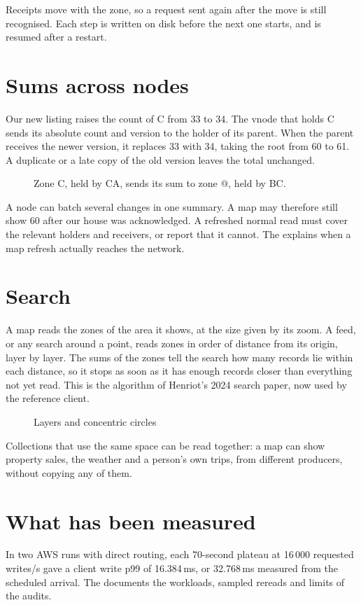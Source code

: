 \documentclass[11pt]{article}
\begin{document}
Receipts move with the zone, so a request sent again after the move is still recognised. Each step is written on disk before the next one starts, and is resumed after a restart.

\section{Sums across nodes}\hypertarget{ix:summaries}{}
Our new listing raises the count of C from 33 to 34. The vnode that holds C sends its absolute count and version to the holder of its parent. When the parent receives the newer version, it replaces 33 with 34, taking the root from 60 to 61. A duplicate or a late copy of the old version leaves the total unchanged.

\begin{figure}[H]
    \centering
    \caption{Zone C, held by CA, sends its sum to zone @, held by BC.}
\end{figure}

A node can batch several changes in one summary. A map may therefore still show 60 after our house was acknowledged. A refreshed normal read must cover the relevant holders and receivers, or report that it cannot. The  explains when a map refresh actually reaches the network.

\section{Search}\hypertarget{ix:search}{}
A map reads the zones of the area it shows, at the size given by its zoom. A feed, or any search around a point, reads zones in order of distance from its origin, layer by layer. The sums of the zones tell the search how many records lie within each distance, so it stops as soon as it has enough records closer than everything not yet read. This is the algorithm of Henriot's 2024 search paper, now used by the reference client.

\begin{figure}[H]
    \centering
    \caption{Layers and concentric circles}
\end{figure}

Collections that use the same space can be read together: a map can show property sales, the weather and a person's own trips, from different producers, without copying any of them.

\section{What has been measured}
In two AWS runs with direct routing, each 70-second plateau at 16\,000 requested writes/s gave a client write p99 of 16.384\,ms, or 32.768\,ms measured from the scheduled arrival. The  documents the workloads, sampled rereads and limits of the audits.
\end{document}
